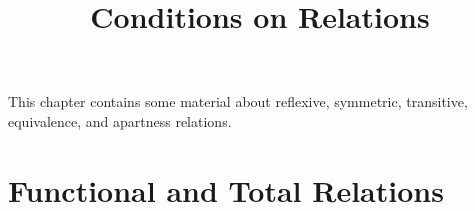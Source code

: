 

%



\title{Conditions on Relations}

\maketitle

\label{section-phantom}

This chapter contains some material about reflexive, symmetric, transitive, equivalence, and apartness relations.

\ChapterTableOfContents

\section{Functional and Total Relations}\label{section-functional-and-total-relations}
